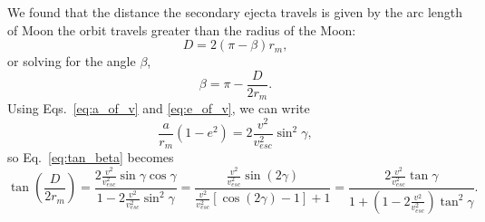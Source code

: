 \documentclass{hitec}
\begin{document}
We found that the distance the secondary ejecta travels is given by the arc length of Moon the orbit travels greater than the radius of the Moon:
\begin{equation}\label{eq:D}
D = 2(\pi-\beta)r_m,
\end{equation}
or solving for the angle $\beta$,
\begin{equation}
\beta = \pi - \frac{D}{2r_m}.
\end{equation}
Using Eqs.\ \ref{eq:a_of_v} and \ref{eq:e_of_v}, we can write
\begin{equation}
\frac{a}{r_m}(1-e^2) = 2\frac{v^2}{v_{esc}^2}\sin^2\gamma,
\end{equation}
so Eq.\ \ref{eq:tan_beta} becomes \citep[c.f., Eq.\ (1) of][]{vickery1986size}
\begin{equation}\label{eq:ejecta_distance}
\tan\left(\frac{D}{2r_m}\right) = \frac{2\frac{v^2}{v_{esc}^2}\sin\gamma\cos\gamma}{1-2\frac{v^2}{v_{esc}^2}\sin^2\gamma} = \frac{\frac{v^2}{v_{esc}^2}\sin(2\gamma)}{\frac{v^2}{v_{esc}^2}[\cos(2\gamma)-1]+1}
=\frac{2\frac{v^2}{v_{esc}^2}\tan\gamma}{1+(1-2\frac{v^2}{v_{esc}^2})\tan^2\gamma}.
\end{equation}
\end{document}
